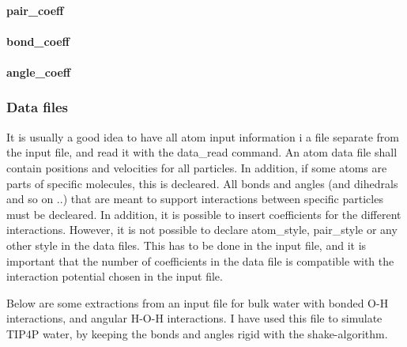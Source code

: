 \paragraph{pair\_coeff}

\paragraph{bond\_coeff}

\paragraph{angle\_coeff}


\subsubsection{Data files}
It is usually a good idea to have all atom input information i a file separate from the input file, and read it with the data\_read command. An atom data file shall contain positions and velocities for all particles. In addition, if some atoms are parts of specific molecules, this is decleared. All bonds and angles (and dihedrals and so on ..) that are meant to support interactions between specific particles must be decleared. In addition, it is possible to insert coefficients for the different interactions. However, it is not possible to declare atom\_style, pair\_style or any other style in the data files. This has to be done in the input file, and it is important that the number of coefficients in the data file is compatible with the interaction potential chosen in the input file. 

Below are some extractions from an input file for bulk water with bonded O-H interactions, and angular H-O-H interactions. I have used this file to simulate TIP4P water, by keeping the bonds and angles rigid with the shake-algorithm. 

